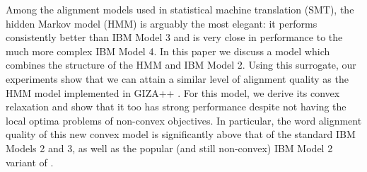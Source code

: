 Among the alignment models used in statistical machine translation (SMT), the hidden Markov model (HMM) is arguably the most elegant: it performs consistently better than IBM Model 3 and is very close in performance to the much more complex IBM Model 4. In this paper we discuss a model which combines the structure of the HMM and IBM Model 2. Using this surrogate, our experiments show that we can attain a similar level of alignment quality as the HMM model implemented in GIZA++ \cite{och03}. For this model, we derive its convex relaxation and show that it too has strong performance despite not having the local optima problems of non-convex objectives. In particular, the word alignment quality of this new convex model is significantly above that of the standard IBM Models 2 and 3, as well as the popular (and still non-convex) IBM Model 2 variant of \cite{dyer13}.
